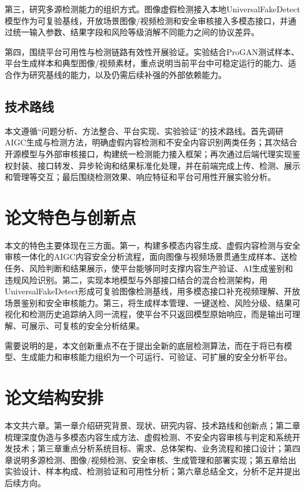 第三，研究多源检测能力的组织方式。图像虚假检测接入本地UniversalFakeDetect模型作为可复验基线，开放场景图像/视频检测和安全审核接入多模态接口，并通过统一输入参数、结果字段和风险等级消解不同能力之间的协议差异。

第四，围绕平台可用性与检测链路有效性开展验证。实验结合ProGAN测试样本、平台生成样本和典型图像/视频素材，重点说明当前平台中可稳定运行的能力、适合作为研究基线的能力，以及仍需后续补强的外部依赖能力。

\subsection{技术路线}

本文遵循“问题分析、方法整合、平台实现、实验验证”的技术路线。首先调研AIGC生成与检测方法，明确虚假内容检测和不安全内容识别两类任务；其次结合开源模型与外部审核接口，构建统一检测能力接入框架；再次通过后端代理实现鉴权封装、接口转发、异步轮询和结果标准化处理，并在前端完成上传、检测、展示和管理等交互；最后围绕检测效果、响应特征和平台可用性开展实验分析。

\section{论文特色与创新点}

本文的特色主要体现在三方面。第一，构建多模态内容生成、虚假内容检测与安全审核一体化的AIGC内容安全分析流程，面向图像与视频场景贯通生成样本、送检任务、风险判断和结果展示，使平台能够同时支撑内容生产验证、AI生成鉴别和违规风险识别。第二，实现本地模型与外部接口结合的混合检测架构，用UniversalFakeDetect形成可复验图像检测基线，用多模态接口补充视频理解、开放场景鉴别和安全审核能力。第三，将生成样本管理、一键送检、风险分级、结果可视化和检测历史追踪纳入同一流程，使平台不只返回模型原始响应，而是输出可理解、可展示、可复核的安全分析结果。

需要说明的是，本文创新重点不在于提出全新的底层检测算法，而在于将已有模型、生成能力和审核能力组织为一个可运行、可验证、可扩展的安全分析平台。

\section{论文结构安排}

本文共六章。第一章介绍研究背景、现状、研究内容、技术路线和创新点；第二章梳理深度伪造与多模态内容生成方法、虚假检测、不安全内容审核与判定和系统开发技术；第三章重点分析系统目标、需求、总体架构、业务流程和接口设计；第四章说明多源检测、图像/视频检测、安全审核、生成管理和部署实现；第五章给出实验设计、样本构成、检测验证和可用性分析；第六章总结全文，分析不足并提出后续方向。
